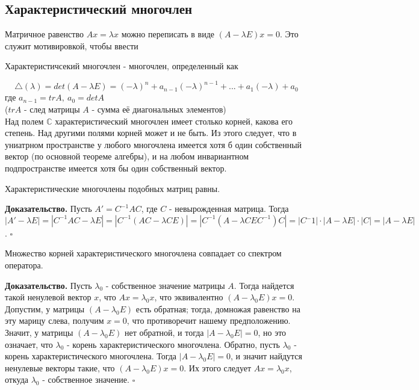 \subsection{Характеристический многочлен}
Матричное равенство $Ax=\lambda x$ можно переписать в виде $(A -\lambda E)x=0$.
Это служит мотивировкой, чтобы ввести 
\begin{defin}
Характеристичсекий многочлен - многочлен, определенный как 
\end{defin}
$$\triangle(\lambda)=det(A-\lambda E)=(-\lambda)^n+a_{n-1}(-\lambda)^{n-1}+
...+a_1(-\lambda)+a_0$$
где $a_{n-1}=trA,~a_0=detA$\\ 
($trA$ - след матрицы $A$ - сумма её диагональных элементов)\\
Над полем $\mathbb C$ характеристический многочлен имеет столько корней,
какова его степень. Над другими полями корней может и не быть. Из этого 
следует, что в униатрном пространстве у любого многочлена имеется хотя б один 
собственный вектор (по основной теореме алгебры), и на любом инвариантном 
подпространстве имеется хотя бы один собственный вектор.
\begin{theor}\label{harakt_mnch_podob}
Характеристические многочлены подобных матриц равны.
\end{theor}
\textbf{Доказательство.} Пусть $A'=C^{-1}AC$, где $C$ - невырожденная матрица. 
Тогда $|A'-\lambda E|=|C^{-1}AC-\lambda E|=|C^{-1}(AC-\lambda CE)|=|C^{-1}
(A-\lambda CEC^{-1})C|=|C{^-1}|\cdot|A-\lambda E|\cdot|C|=|A-\lambda E|$.
$\square$
\begin{theor}
Множество корней характеристического многочлена совпадает со спектром оператора.
\end{theor}
\textbf{Доказательство.} Пусть $\lambda_0$ - собственное значение матрицы $A$. 
Тогда найдется такой ненулевой вектор $x$, что $Ax=\lambda_0x$, что эквивалентно
$(A -\lambda_0 E)x=0$. Допустим, у матрицы $(A -\lambda_0 E)$ есть обратная; 
тогда, домножая равенство на эту марицу слева, получим $x=0$, что противоречит
нашему предположению. Значит, у матрицы $(A -\lambda_0 E)$ нет обратной, и 
тогда $|A -\lambda_0 E|=0$, но это означает, что $\lambda_0$ - корень 
характеристического многочлена. 
Обратно, пусть $\lambda_0$ - корень характеристического многочлена. Тогда $|A
-\lambda_0 E|=0$, и значит найдутся ненулевые векторы такие, что $(A -
\lambda_0 E)x=0$. Их этого следует $Ax=\lambda_0x$, откуда $\lambda_0$ -
собственное значение. $\square$


